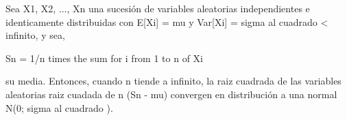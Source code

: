\documentclass{article}
\begin{document}

Sea X1, X2, ..., Xn una sucesión de variables aleatorias independientes e identicamente distribuidas con E[Xi] = mu y Var[Xi] = sigma al cuadrado < infinito, 
y sea,

Sn = 1/n times the sum for i from 1 to n of Xi

su media. Entonces, cuando  n tiende a infinito, la raiz cuadrada 
de las variables aleatorias raiz cuadada de n (Sn - mu) convergen en
distribución a una normal N(0; sigma al cuadrado ).
\end{document}
